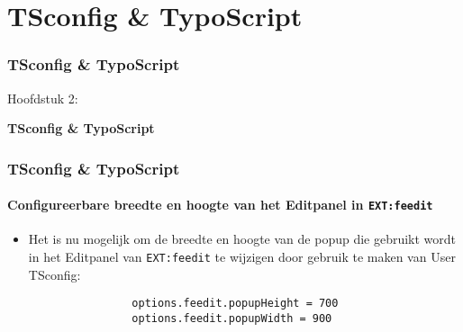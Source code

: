 %

\section{TSconfig \& TypoScript}
\begin{frame}[fragile]
	\frametitle{TSconfig \& TypoScript}

	\begin{center}\huge{Hoofdstuk 2:}\end{center}
	\begin{center}\huge{\color{typo3darkgrey}\textbf{TSconfig \& TypoScript}}\end{center}

\end{frame}


\begin{frame}[fragile]
	\frametitle{TSconfig \& TypoScript}
	\framesubtitle{Configureerbare breedte en hoogte van het Editpanel in \texttt{EXT:feedit}}

	\lstset{basicstyle=\small\ttfamily}

	\begin{itemize}

		\item Het is nu mogelijk om de breedte en hoogte van de popup die gebruikt wordt in het Editpanel van \texttt{EXT:feedit}
		    te wijzigen door gebruik te maken van User TSconfig:
			\begin{lstlisting}
				options.feedit.popupHeight = 700
				options.feedit.popupWidth = 900
			\end{lstlisting}

	\end{itemize}

\end{frame}

